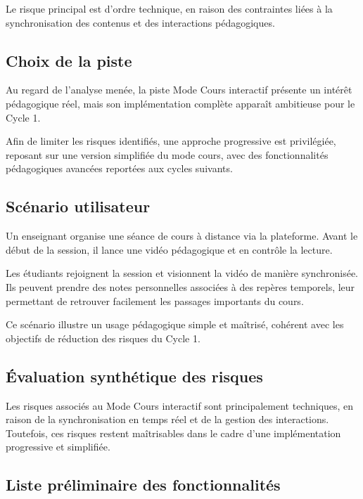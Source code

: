\documentclass[12pt,a4paper]{report}
\begin{document}
Le risque principal est d’ordre technique, en raison des contraintes liées à la
synchronisation des contenus et des interactions pédagogiques.

\subsection{Choix de la piste}

Au regard de l’analyse menée, la piste Mode Cours interactif présente un intérêt
pédagogique réel, mais son implémentation complète apparaît ambitieuse pour le
Cycle 1.

Afin de limiter les risques identifiés, une approche progressive est privilégiée,
reposant sur une version simplifiée du mode cours, avec des fonctionnalités
pédagogiques avancées reportées aux cycles suivants.

\subsection{Scénario utilisateur}

Un enseignant organise une séance de cours à distance via la plateforme.
Avant le début de la session, il lance une vidéo pédagogique et en contrôle
la lecture.

Les étudiants rejoignent la session et visionnent la vidéo de manière
synchronisée.
Ils peuvent prendre des notes personnelles associées à des repères temporels,
leur permettant de retrouver facilement les passages importants du cours.

Ce scénario illustre un usage pédagogique simple et maîtrisé, cohérent avec
les objectifs de réduction des risques du Cycle 1.

\subsection{Évaluation synthétique des risques}

Les risques associés au Mode Cours interactif sont principalement techniques,
en raison de la synchronisation en temps réel et de la gestion des interactions.
Toutefois, ces risques restent maîtrisables dans le cadre d’une implémentation
progressive et simplifiée.

\subsection{Liste préliminaire des fonctionnalités}
\end{document}
